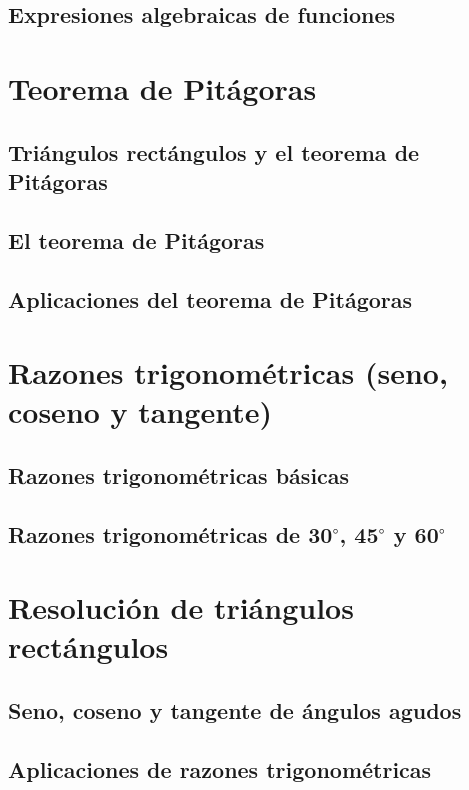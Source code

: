\documentclass[11pt]{book}
\begin{document}
\subsection{Expresiones algebraicas de funciones}

\newpage \thispagestyle{plain}
\section{Teorema de Pitágoras}
\subsection{Triángulos rectángulos y el teorema de Pitágoras}
\subsection{El teorema de Pitágoras}
\subsection{Aplicaciones del teorema de Pitágoras}

\newpage \thispagestyle{plain}
\section{Razones trigonométricas (seno, coseno y tangente)}
\subsection{Razones trigonométricas básicas}
\subsection{Razones trigonométricas de 30$^{\circ}$, 45$^{\circ}$ y 60$^{\circ}$}

\newpage \thispagestyle{plain}
\section{Resolución de triángulos rectángulos}
\subsection{Seno, coseno y tangente de ángulos agudos}
\subsection{Aplicaciones de razones trigonométricas}
\end{document}
